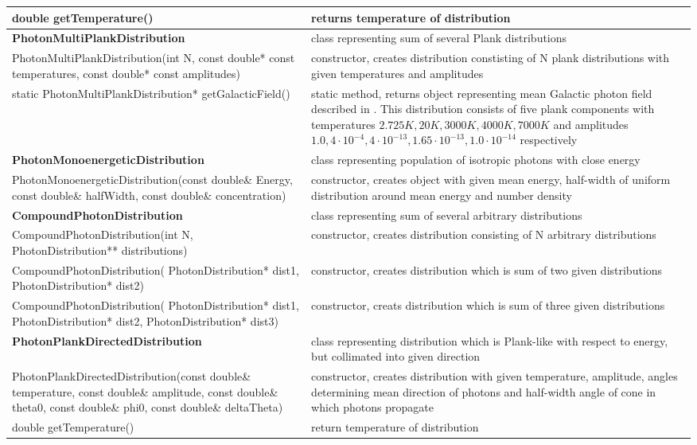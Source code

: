 \begin{small}
\begin{xtabular}{|p{0.45\textwidth}|p{0.55\textwidth}|}
				\hline
				double getTemperature() & returns temperature of distribution\\
				\hline
				\textbf{PhotonMultiPlankDistribution} & class representing sum of several Plank distributions\\
				\hline
				PhotonMultiPlankDistribution(int N, const double* const temperatures, const double* const amplitudes) & constructor, creates distribution constisting of N plank distributions with given temperatures and amplitudes\\
				\hline
				static PhotonMultiPlankDistribution* getGalacticField() & static method, returns object representing mean Galactic photon field described in \cite{Mathis1983}. This distribution consists of five plank components with temperatures $2.725K, 20K, 3000K, 4000K, 7000K$ and amplitudes $1.0, 4\cdot10^{-4}, 4\cdot10^{-13}, 1.65\cdot10^{-13}, 1.0\cdot10^{-14}$ respectively\\
				\hline
				\textbf{PhotonMonoenergeticDistribution} & class representing population of isotropic photons with close energy\\
				\hline
				PhotonMonoenergeticDistribution(const double\& Energy, const double\& halfWidth, const double\& concentration) & constructor, creates object with given mean energy, half-width of uniform distribution around mean energy and number density\\
				\hline
				\textbf{CompoundPhotonDistribution} & class representing sum of several arbitrary distributions\\
				\hline
				CompoundPhotonDistribution(int N, PhotonDistribution** distributions) & constructor, creates distribution consisting of N arbitrary distributions\\
				\hline
				CompoundPhotonDistribution( PhotonDistribution* dist1, PhotonDistribution* dist2) & constructor, creates distribution which is sum of two given distributions\\
				\hline
				CompoundPhotonDistribution( PhotonDistribution* dist1, PhotonDistribution* dist2, PhotonDistribution* dist3) & constructor, creats distribution which is sum of three given distributions\\
				\hline
				\textbf{PhotonPlankDirectedDistribution} & class representing distribution which is Plank-like with respect to energy, but collimated into given direction\\
				\hline
				PhotonPlankDirectedDistribution(const double\& temperature, const double\& amplitude, const double\& theta0, const double\& phi0, const double\& deltaTheta) & constructor, creates distribution with given temperature, amplitude, angles determining mean direction of photons and half-width angle of cone in which photons propagate\\
				\hline
				double getTemperature() & return temperature of distribution\\
				\hline
	\end{xtabular}
\end{small}

